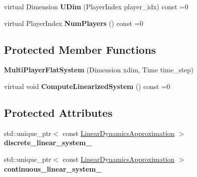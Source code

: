 \begin{DoxyCompactItemize}
\item 
virtual Dimension {\bfseries U\+Dim} (Player\+Index player\+\_\+idx) const =0\hypertarget{classilqgames_1_1_multi_player_flat_system_a1cb3a0636263a35dd2b10f8b203bf29b}{}\label{classilqgames_1_1_multi_player_flat_system_a1cb3a0636263a35dd2b10f8b203bf29b}

\item 
virtual Player\+Index {\bfseries Num\+Players} () const =0\hypertarget{classilqgames_1_1_multi_player_flat_system_a5732cac3a3a64567a3d1b460d787a52d}{}\label{classilqgames_1_1_multi_player_flat_system_a5732cac3a3a64567a3d1b460d787a52d}

\end{DoxyCompactItemize}
\subsection*{Protected Member Functions}
\begin{DoxyCompactItemize}
\item 
{\bfseries Multi\+Player\+Flat\+System} (Dimension xdim, Time time\+\_\+step)\hypertarget{classilqgames_1_1_multi_player_flat_system_a73df802233de8b218744e662ab250b59}{}\label{classilqgames_1_1_multi_player_flat_system_a73df802233de8b218744e662ab250b59}

\item 
virtual void {\bfseries Compute\+Linearized\+System} () const =0\hypertarget{classilqgames_1_1_multi_player_flat_system_ab5e1b8bb3cf07f07c04d7f3884c1c015}{}\label{classilqgames_1_1_multi_player_flat_system_ab5e1b8bb3cf07f07c04d7f3884c1c015}

\end{DoxyCompactItemize}
\subsection*{Protected Attributes}
\begin{DoxyCompactItemize}
\item 
std\+::unique\+\_\+ptr$<$ const \hyperlink{structilqgames_1_1_linear_dynamics_approximation}{Linear\+Dynamics\+Approximation} $>$ {\bfseries discrete\+\_\+linear\+\_\+system\+\_\+}\hypertarget{classilqgames_1_1_multi_player_flat_system_a70c6bbb2e4cd3653594fd650fbcdad94}{}\label{classilqgames_1_1_multi_player_flat_system_a70c6bbb2e4cd3653594fd650fbcdad94}

\item 
std\+::unique\+\_\+ptr$<$ const \hyperlink{structilqgames_1_1_linear_dynamics_approximation}{Linear\+Dynamics\+Approximation} $>$ {\bfseries continuous\+\_\+linear\+\_\+system\+\_\+}\hypertarget{classilqgames_1_1_multi_player_flat_system_ab4961edf0a14f8645c79d2ad39ebd7d6}{}\label{classilqgames_1_1_multi_player_flat_system_ab4961edf0a14f8645c79d2ad39ebd7d6}

\end{DoxyCompactItemize}


